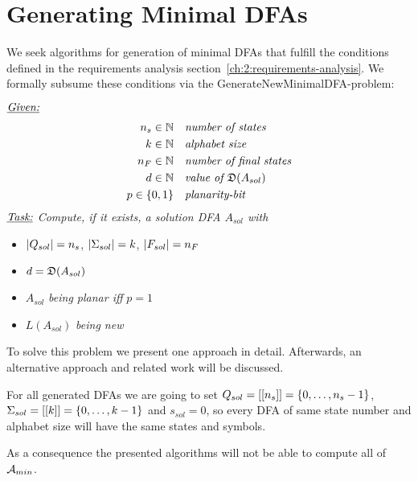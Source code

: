 
\chapter{Generating Minimal DFAs} \label{ch:3}

We seek algorithms for generation of minimal DFAs that fulfill the conditions defined in the requirements analysis section~\ref{ch:2:requirements-analysis}. We formally subsume these conditions via the GenerateNewMinimalDFA-problem:
\begin{definition}[GenNewMinDFA] $ $ \\
	$ $ \vspace{-0.4cm} \\
	\noindent $\underline{\emph{Given:}}$
	\vspace{-0.5cm}
	\begin{align*}
	{n_s} \in \mathbb{N}\ \ \ & \emph{number of states} \\
	k \in \mathbb{N}\ \ \ & \emph{alphabet size} \\
	{n_F} \in \mathbb{N}\ \ \ & \emph{number of final states} \\
	d \in \mathbb{N}\ \ \ & \emph{value of $\mathfrak{D}(A_{sol})$} \\
	p \in \{0,1\}\ \ \ & \emph{planarity-bit}
	\end{align*}
	\noindent $\underline{\emph{Task:}}$ \emph{Compute, if it exists, a solution DFA $A_{sol}$ with}
	\begin{itemize}
		\item $|Q_{sol}|={n_s}$, $|\Sigma_{sol}|=k$, $|F_{sol}|={n_F}$
		\item $d = \mathfrak{D}(A_{sol})$
		\item $A_{sol}$ \emph{being planar iff} $p = 1$
		\item $L(A_{sol})$ \emph{being new}
	\end{itemize}
\end{definition}
\noindent To solve this problem we present one approach in detail. Afterwards, an alternative approach and related work will be discussed.

\begin{remark}\label{ch:3:rem:qas-set}
	For all generated DFAs we are going to set $Q_{sol} = [[{n_s}]] = \{0,\ldots,{n_s}-1\}$, $\Sigma_{sol} = [[k]] = \{0,\ldots,k-1\}$ and $s_{sol} = 0$, so every DFA of same state number and alphabet size will have the same states and symbols.
\end{remark}
\noindent As a consequence the presented algorithms will not be able to compute all of ${\mathcal{A}_{min}}$.

